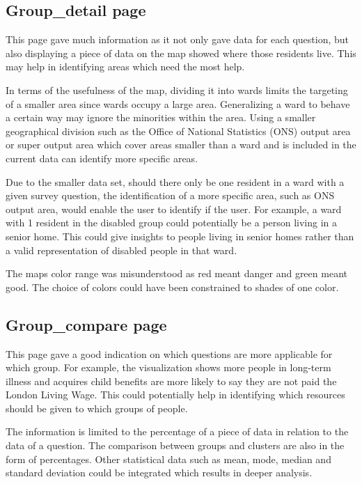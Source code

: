 \subsection{Group\_detail page}
This page gave much information as it not only gave data for each question, but also displaying a piece of data on the map showed where those residents live. This may help in identifying areas which need the most help.\par

In terms of the usefulness of the map, dividing it into wards limits the targeting of a smaller area since wards occupy a large area. Generalizing a ward to behave a certain way may ignore the minorities within the area. Using a smaller geographical division such as the Office of National Statistics\textsc{} (ONS) output area or super output area which cover areas smaller than a ward and is included in the current data can identify more specific areas. \par

Due to the smaller data set, should there only be one resident in a ward with a given survey question, the identification of a more specific area, such as ONS\textsc{} output area, would enable the user to identify if the user. For example, a ward with 1 resident in the disabled group could potentially be a person living in a senior home. This could give insights to people living in senior homes rather than a valid representation of disabled people in that ward.\par

The map\textsc{}s color range was misunderstood as red meant danger and green meant good. The choice of colors could have been constrained to shades of one color.\par

\subsection{Group\_compare page}

This page gave a good indication on which questions are more applicable for which group. For example, the visualization shows more people in long-term illness and acquires child benefits are more likely to say they are not paid the London Living Wage. This could potentially help in identifying which resources should be given to which groups of people.\par

The information is limited to the percentage of a piece of data in relation to the data of a question. The comparison between groups and clusters are also in the form of percentages. Other statistical data such as mean, mode, median and standard deviation could be integrated which results in deeper analysis.

